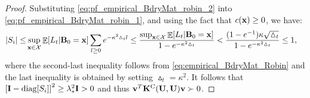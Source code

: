 \documentclass[aos,preprint]{imsart}
\theoremstyle{plain}
\DeclareMathOperator{\E}{\mathbb E}
\newcommand{\CalX}{\mathcal X}
\newcommand{\BFX}{\bold X}
\newcommand{\BFx}{\bold x}
\newcommand{\BU}{\bold U}
\newcommand{\BK}{\bold K}
\theoremstyle{remark}
\begin{document}
\begin{proof}
Substituting \eqref{eq:pf_empirical_BdryMat_robin_2} into \eqref{eq:pf_empirical_BdryMat_robin_1}, and using the fact that $c(\BFx)\geq 0$, we have:
\begin{align*}
    |S_i|\leq &\sup_{\BFx\in\CalX}\E[L_t|\bold{B}_0=\BFx]\sum_{l\geq 0}e^{-\kappa^2\vartriangle_t l}
    \leq \frac{\sup_{\BFx\in\CalX}\E[L_t|\bold{B}_0=\BFx]}{1-e^{-\kappa^2 \vartriangle_t}}
    < \frac{(1-e^{-1})\kappa \sqrt{\vartriangle_t} }{1-e^{-\kappa^2 \vartriangle_t}}
    \leq 1,
\end{align*}
where the second-last inequality follows from \eqref{eq:empirical_BdryMat_Robin} and the last inequality is obtained by setting $\vartriangle_t=\kappa^2$. It follows that $\left[\bold{I}-\text{diag}[S_i]\right]^2\geq \lambda_*^2\bold{I}> 0$ and thus $\bold{v}^T\BK^{\rm C}(\BU,\BU)\bold{v} \succ 0$.
\end{proof}




\end{document}
